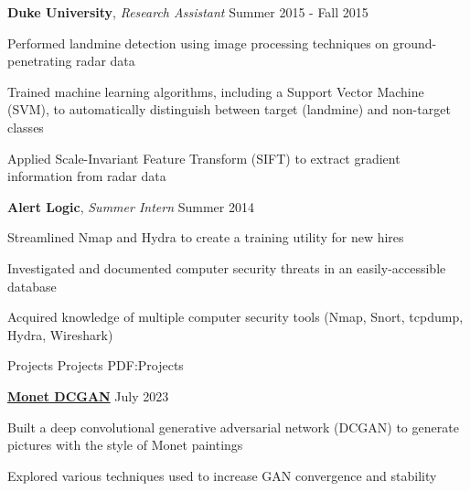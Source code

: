 \documentclass[letterpaper,MMMyyyy,nonstopmode]{simpleresumecv}
\begin{document}
\begin{Body}
\vspace{0.1cm}

\Entry
\textbf{Duke University}, \textit{Research Assistant} 
\hfill Summer 2015 - Fall 2015

\par
\BulletItem Performed landmine detection using image processing techniques on ground-penetrating radar data
\par
\BulletItem Trained machine learning algorithms, including a Support Vector Machine (SVM), to automatically distinguish between target (landmine) and non-target classes
\par
\BulletItem Applied Scale-Invariant Feature Transform (SIFT) to extract gradient information from radar data
\par 

\vspace{0.1cm}

\Entry
\textbf{Alert Logic}, \textit{Summer Intern} 
\hfill Summer 2014

\par
\BulletItem Streamlined Nmap and Hydra to create a training utility for new hires
\par
\BulletItem Investigated and documented computer security threats in an easily-accessible database
\par
\BulletItem Acquired knowledge of multiple computer security tools (Nmap, Snort, tcpdump, Hydra, Wireshark)
\par 


\Section
{Projects}
{Projects}
{PDF:Projects}

\iffalse
\Entry
\href{https://github.com/alex-garvey/kaggle-projects}{\textbf{Paper Replication}} \hfill August 2023

\par
\BulletItem replicated paper todo alex 1
\par
\BulletItem replicated paper todo alex 2
\par 

\vspace{0.1cm}
\fi

\Entry
\href{https://github.com/alex-garvey/kaggle-projects}{\textbf{Monet DCGAN}} \hfill July 2023

\par
\BulletItem Built a deep convolutional generative adversarial network (DCGAN) to generate pictures with the style of Monet paintings
\par
\BulletItem Explored various techniques used to increase GAN convergence and stability %
\par 


\end{Body}
\end{document}
